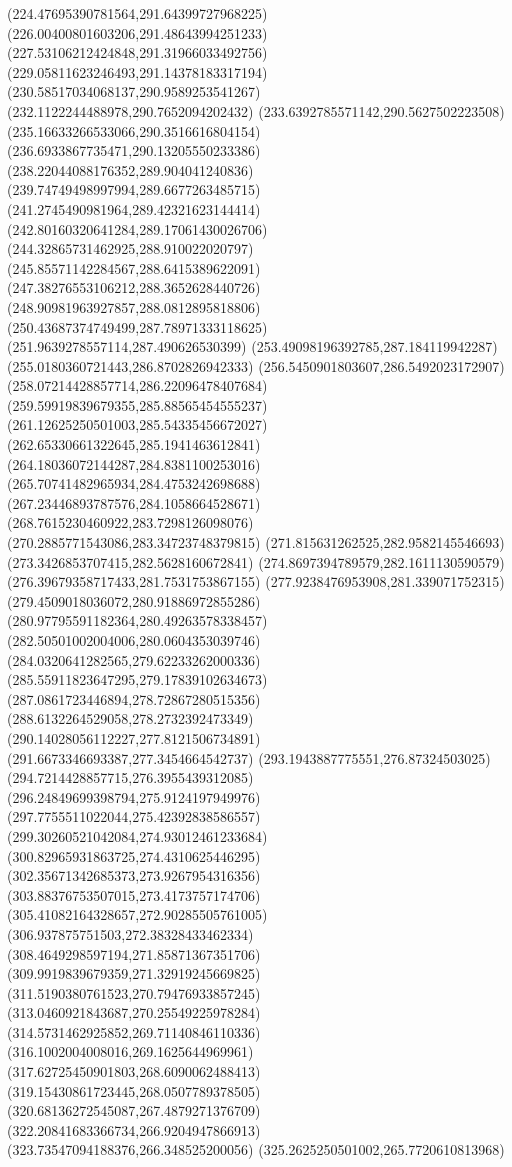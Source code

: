 {(224.47695390781564,291.64399727968225)
(226.00400801603206,291.48643994251233)
(227.53106212424848,291.31966033492756)
(229.05811623246493,291.14378183317194)
(230.58517034068137,290.9589253541267)
(232.1122244488978,290.7652094202432)
(233.6392785571142,290.5627502223508)
(235.16633266533066,290.3516616804154)
(236.6933867735471,290.13205550233386)
(238.22044088176352,289.904041240836)
(239.74749498997994,289.6677263485715)
(241.2745490981964,289.42321623144414)
(242.80160320641284,289.17061430026706)
(244.32865731462925,288.910022020797)
(245.85571142284567,288.6415389622091)
(247.38276553106212,288.3652628440726)
(248.90981963927857,288.0812895818806)
(250.43687374749499,287.78971333118625)
(251.9639278557114,287.490626530399)
(253.49098196392785,287.184119942287)
(255.0180360721443,286.8702826942333)
(256.5450901803607,286.5492023172907)
(258.07214428857714,286.22096478407684)
(259.59919839679355,285.88565454555237)
(261.12625250501003,285.54335456672027)
(262.65330661322645,285.1941463612841)
(264.18036072144287,284.8381100253016)
(265.70741482965934,284.4753242698688)
(267.23446893787576,284.1058664528671)
(268.7615230460922,283.7298126098076)
(270.2885771543086,283.34723748379815)
(271.815631262525,282.9582145546693)
(273.3426853707415,282.5628160672841)
(274.8697394789579,282.1611130590579)
(276.39679358717433,281.7531753867155)
(277.9238476953908,281.339071752315)
(279.4509018036072,280.91886972855286)
(280.97795591182364,280.49263578338457)
(282.50501002004006,280.0604353039746)
(284.0320641282565,279.62233262000336)
(285.55911823647295,279.17839102634673)
(287.0861723446894,278.72867280515356)
(288.6132264529058,278.2732392473349)
(290.14028056112227,277.8121506734891)
(291.6673346693387,277.3454664542737)
(293.1943887775551,276.87324503025)
(294.7214428857715,276.3955439312085)
(296.24849699398794,275.9124197949976)
(297.7755511022044,275.42392838586557)
(299.30260521042084,274.93012461233684)
(300.82965931863725,274.4310625446295)
(302.35671342685373,273.9267954316356)
(303.88376753507015,273.4173757174706)
(305.41082164328657,272.90285505761005)
(306.937875751503,272.38328433462334)
(308.4649298597194,271.85871367351706)
(309.9919839679359,271.32919245669825)
(311.5190380761523,270.79476933857245)
(313.0460921843687,270.25549225978284)
(314.5731462925852,269.71140846110336)
(316.1002004008016,269.1625644969961)
(317.62725450901803,268.6090062488413)
(319.15430861723445,268.0507789378505)
(320.68136272545087,267.4879271376709)
(322.20841683366734,266.9204947866913)
(323.73547094188376,266.348525200056)
(325.2625250501002,265.7720610813968)
}

